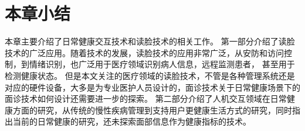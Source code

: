



\section{本章小结}
本章主要介绍了日常健康交互技术和读脸技术的相关工作。
第一部分介绍了读脸技术的广泛应用。随着技术的发展，读脸技术的应用非常广泛，从安防和访问控制，到情绪识别，也广泛用于医疗领域识别病人信息，远程监测患者， 甚至用于检测健康状态。
但是本文关注的医疗领域的读脸技术，不管是各种管理系统还是对应的硬件设备，大多是为专业医护人员设计的，面诊技术关于日常健康场景下的面诊技术如何设计还需要进一步的探索。
第二部分介绍了人机交互领域在日常健康方面的研究，从传统的慢性疾病管理到支持用户更健康生活方式的研究，同时指出当前的日常健康的研究，还未探索面部信息作为健康指标的技术。

